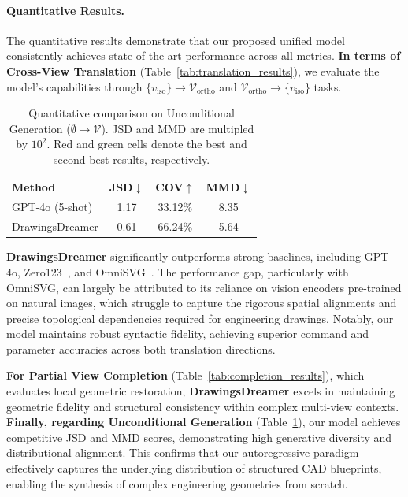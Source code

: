 \documentclass{article}
\begin{document}
\paragraph{Quantitative Results.}
The quantitative results demonstrate that our proposed unified model consistently achieves state-of-the-art performance across all metrics. \textbf{In terms of Cross-View Translation} (Table~\ref{tab:translation_results}), we evaluate the model's capabilities through $\{v_{\text{iso}}\} \rightarrow \mathcal{V}_{\text{ortho}}$ and $\mathcal{V}_{\text{ortho}} \rightarrow \{v_{\text{iso}}\}$ tasks. 
\begin{table}
  \centering
  \caption{Quantitative comparison on Unconditional Generation ($\emptyset \rightarrow \mathcal{V}$). JSD and MMD are multipled by $10^2$. \colorbox{red!20}{Red} and \colorbox{green!20}{green} cells denote the best and second-best results, respectively.}
  \label{tab:uncond_results}
  \begin{tabular}{l ccc}
    \toprule
    Method & JSD$\downarrow$ & COV$\uparrow$ & MMD$\downarrow$ \\
    \midrule
    GPT-4o (5-shot)& \cellcolor{green!20}1.17 & \cellcolor{green!20}33.12\% & \cellcolor{green!20}8.35 \\
    DrawingsDreamer & \cellcolor{red!20}0.61 & \cellcolor{red!20}66.24\% & \cellcolor{red!20}5.64 \\
    \bottomrule
  \end{tabular}
\end{table}\textbf{DrawingsDreamer} significantly outperforms strong baselines, including GPT-4o, Zero123~\cite{liu2023zero}, and OmniSVG~\cite{yang2025omnisvg}. The performance gap, particularly with OmniSVG, can largely be attributed to its reliance on vision encoders pre-trained on natural images, which struggle to capture the rigorous spatial alignments and precise topological dependencies required for engineering drawings. Notably, our model maintains robust syntactic fidelity, achieving superior command and parameter accuracies across both translation directions. 

\textbf{For Partial View Completion} (Table~\ref{tab:completion_results}), which evaluates local geometric restoration, \textbf{DrawingsDreamer} excels in maintaining geometric fidelity and structural consistency within complex multi-view contexts. \textbf{Finally, regarding Unconditional Generation} (Table~\ref{tab:uncond_results}), our model achieves competitive JSD and MMD scores, demonstrating high generative diversity and distributional alignment. This confirms that our autoregressive paradigm effectively captures the underlying distribution of structured CAD blueprints, enabling the synthesis of complex engineering geometries from scratch.
\end{document}
